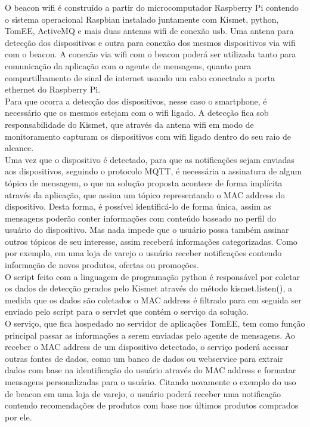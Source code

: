 \indent O beacon wifi é construído a partir do microcomputador Raspberry Pi contendo o sistema operacional Raspbian instalado juntamente com Kismet, python, TomEE, ActiveMQ e mais duas antenas wifi de conexão usb. Uma antena para detecção dos dispositivos e outra para conexão dos mesmos dispositivos via wifi com o beacon. A conexão via wifi com o beacon poderá ser utilizada tanto para comunicação da aplicação com o agente de mensagens, quanto para compartilhamento de sinal de internet usando um cabo conectado a porta ethernet do Raspberry Pi. \\  
\indent Para que ocorra a detecção dos dispositivos, nesse caso o smartphone, é necessário que os mesmos estejam com o wifi ligado. A detecção fica sob responsabilidade do Kismet, que através da antena wifi em modo de monitoramento capturam os dispositivos com wifi ligado dentro do seu raio de alcance. \\
\indent Uma vez que o dispositivo é detectado, para que as notificações sejam enviadas aos dispositivos, seguindo o protocolo MQTT, é necessária a assinatura de algum tópico de mensagem, o que na solução proposta acontece de forma implícita através da aplicação, que assina um tópico representando o MAC address do dispositivo. Desta forma, é possível identificá-lo de forma única, assim as mensagens poderão conter informações com conteúdo baseado no perfil do usuário do dispositivo. Mas nada impede que o usuário possa também assinar outros tópicos de seu interesse, assim receberá informações categorizadas. Como por exemplo, em uma loja de varejo o usuário receber notificações contendo informação de novos produtos, ofertas ou promoções. \\
\indent O script feito com a linguagem de programação python é responsável por coletar os dados de detecção gerados pelo Kismet através do método kismet.listen(), a medida que os dados são coletados o MAC address é filtrado para em seguida ser enviado pelo script para o servlet que contém o serviço da solução. \\
\indent O serviço, que fica hospedado no servidor de aplicações TomEE, tem como função principal passar as informações a serem enviadas pelo agente de mensagens. Ao receber o MAC address de um dispositivo detectado, o serviço poderá acessar outras fontes de dados, como um banco de dados ou webservice para extrair dados com base na identificação do usuário através do MAC address e formatar mensagens personalizadas para o usuário. Citando novamente o exemplo do uso de beacon em uma loja de varejo, o usuário poderá receber uma notificação contendo recomendações de produtos com base nos últimos produtos comprados por ele. \\
